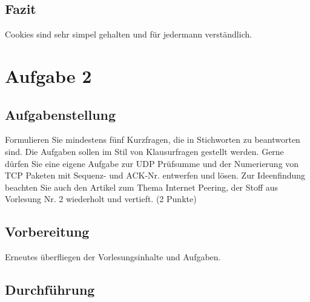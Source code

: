 \subsection{Fazit}
Cookies sind sehr simpel gehalten und für jedermann verständlich.

\section{Aufgabe 2}

\subsection{Aufgabenstellung}
Formulieren Sie mindestens fünf Kurzfragen, die in Stichworten zu beantworten sind. Die Aufgaben sollen im Stil von Klausurfragen gestellt werden. Gerne dürfen Sie eine eigene Aufgabe zur UDP Prüfsumme und der Numerierung von TCP Paketen mit Sequenz- und ACK-Nr. entwerfen und lösen. Zur Ideenfindung beachten Sie auch den Artikel zum Thema Internet Peering, der Stoff aus Vorlesung Nr. 2 wiederholt und vertieft. (2 Punkte)

\subsection{Vorbereitung}
Erneutes überfliegen der Vorlesungsinhalte und Aufgaben.

\subsection{Durchführung}

